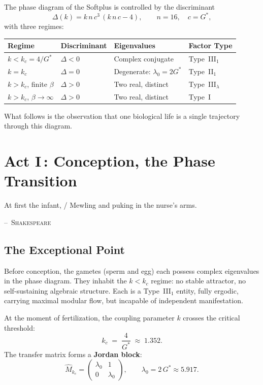 \documentclass[12pt, letterpaper]{article}
\theoremstyle{plain}
\theoremstyle{definition}
\theoremstyle{remark}
\newcommand{\Gstar}{{G^{*}}}              %
\begin{document}
The phase diagram of the Softplus is controlled by the discriminant
\begin{equation}\label{eq:discriminant}
  \Delta(k) = k\,n\,c^3\,(k\,n\,c - 4),
  \qquad n = 16,\quad c = \Gstar,
\end{equation}
with three regimes:
\begin{center}
\renewcommand{\arraystretch}{1.4}
\begin{tabular}{@{}llll@{}}
\toprule
\textbf{Regime} & \textbf{Discriminant} & \textbf{Eigenvalues} & \textbf{Factor Type} \\
\midrule
$k < k_c = 4/\Gstar$ & $\Delta < 0$ & Complex conjugate & Type~III$_1$ \\
$k = k_c$                & $\Delta = 0$ & Degenerate: $\lambda_0 = 2\Gstar$ & Type~II$_1$ \\
$k > k_c$, finite $\beta$ & $\Delta > 0$ & Two real, distinct & Type~III$_\lambda$ \\
$k > k_c$, $\beta \to \infty$ & $\Delta > 0$ & Two real, distinct & Type~I \\
\bottomrule
\end{tabular}
\end{center}

\medskip
\noindent
What follows is the observation that one biological life is a single trajectory through this diagram.


\section{\texorpdfstring{Act I\,: Conception, the Phase Transition}{Act I: Conception, the Phase Transition}}
\label{sec:act1}

\epigraph{At first the infant, / Mewling and puking in the nurse's arms.}{\textsc{--~Shakespeare}}

\subsection{The Exceptional Point}

Before conception, the gametes (sperm and egg) each possess complex eigenvalues in the phase diagram. They inhabit the $k < k_c$ regime: no stable attractor, no self-sustaining algebraic structure. Each is a Type~III$_1$ entity, fully ergodic, carrying maximal modular flow, but incapable of independent manifestation.

At the moment of fertilization, the coupling parameter $k$ crosses the critical threshold:
\begin{equation}\label{eq:kcrit}
  k_c \;=\; \frac{4}{\Gstar} \;\approx\; 1.352.
\end{equation}
The transfer matrix forms a \textbf{Jordan block}:
\begin{equation}\label{eq:jordan}
  \hat{M}_{k_c} = \begin{pmatrix} \lambda_0 & 1 \\ 0 & \lambda_0 \end{pmatrix},
  \qquad \lambda_0 = 2\,\Gstar \approx 5.917.
\end{equation}
\end{document}
